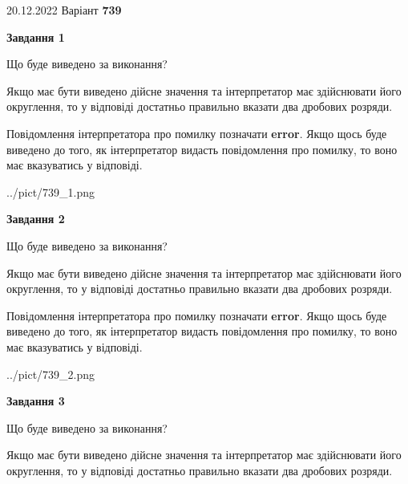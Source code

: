 \documentclass[12pt, ukrainian]{article}
\begin{document}
{20.12.2022 Варіант \No \textbf { 739 }\par}
{
\begin {Large}

{\begin {center}\textbf{Завдання 1}\end {center}}\par
Що буде виведено за виконання? \par

Якщо має бути виведено дійсне значення та інтерпретатор має здійснювати його округлення, 
то у відповіді достатньо правильно вказати два дробових розряди.

Повідомлення інтерпретатора про помилку позначати \textbf{error}.
Якщо щось буде виведено до того, як інтерпретатор видасть повідомлення про помилку, 
то воно має вказуватись у відповіді. \par

\begin{center}
	{../pict/739_1.png}
\end{center}
\newpage

{\begin {center}\textbf{Завдання 2}\end {center}}\par
Що буде виведено за виконання? \par

Якщо має бути виведено дійсне значення та інтерпретатор має здійснювати його округлення, 
то у відповіді достатньо правильно вказати два дробових розряди.

Повідомлення інтерпретатора про помилку позначати \textbf{error}.
Якщо щось буде виведено до того, як інтерпретатор видасть повідомлення про помилку, 
то воно має вказуватись у відповіді. \par

\begin{center}
	{../pict/739_2.png}
\end{center}
\newpage

{\begin {center}\textbf{Завдання 3}\end {center}}\par
Що буде виведено за виконання? \par

Якщо має бути виведено дійсне значення та інтерпретатор має здійснювати його округлення, 
то у відповіді достатньо правильно вказати два дробових розряди.


\end{Large}}
\end{document}

